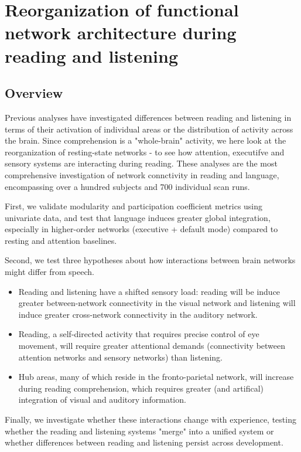 \chapter{Reorganization of functional network architecture during reading and listening}

\section{Overview}

Previous analyses have investigated differences between reading and listening in terms of their activation of individual areas or the distribution of activity across the brain. Since comprehension is a "whole-brain" activity, we here look at the reorganization of resting-state networks - to see how attention, executifve and sensory systems are interacting during reading.  These analyses are the most comprehensive investigation of network connctivity in reading and language, encompassing over a hundred subjects and 700 individual scan runs. 

First, we validate modularity and participation coefficient metrics using univariate data, and test that language induces greater global integration, especially in higher-order networks (executive + default mode) compared to resting and attention baselines.

Second, we test three hypotheses about how interactions between brain networks might differ from speech.

\begin{itemize}
	\item Reading and listening have a shifted sensory load: reading will be induce greater between-network connectivity in the visual network and listening will induce greater cross-network connectivity in the auditory network.  
	\item Reading, a self-directed activity that requires precise control of eye movement, will require greater attentional demands (connectivity between attention networks and sensory networks) than listening. 
	\item Hub areas, many of which reside in the fronto-parietal network, will increase during reading comprehension, which requires greater (and artifical) integration of visual and auditory information.
\end{itemize}

Finally, we investigate whether these interactions change with experience, testing whether the reading and listening systems "merge" into a unified system or whether differences between reading and listening persist across development.

